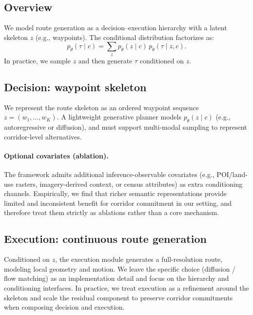 \subsection{Overview}
We model route generation as a decision--execution hierarchy with a latent skeleton $z$ (e.g., waypoints).
The conditional distribution factorizes as:
\begin{equation}
  p_\theta(\tau \mid c) = \sum_{z} p_\theta(z \mid c)\, p_\theta(\tau \mid z, c).
\end{equation}
In practice, we sample $z$ and then generate $\tau$ conditioned on $z$.

\subsection{Decision: waypoint skeleton}
We represent the route skeleton as an ordered waypoint sequence $z = (w_1,\dots,w_K)$.
A lightweight generative planner models $p_\theta(z \mid c)$ (e.g., autoregressive or diffusion), and must support multi-modal sampling to represent corridor-level alternatives.

\paragraph{Optional covariates (ablation).}
The framework admits additional inference-observable covariates (e.g., POI/land-use rasters, imagery-derived context, or census attributes) as extra conditioning channels.
Empirically, we find that richer semantic representations provide limited and inconsistent benefit for corridor commitment in our setting, and therefore treat them strictly as ablations rather than a core mechanism.

\subsection{Execution: continuous route generation}
Conditioned on $z$, the execution module generates a full-resolution route, modeling local geometry and motion.
We leave the specific choice (diffusion / flow matching) as an implementation detail and focus on the hierarchy and conditioning interfaces.
In practice, we treat execution as a refinement around the skeleton and scale the residual component to preserve corridor commitments when composing decision and execution.

